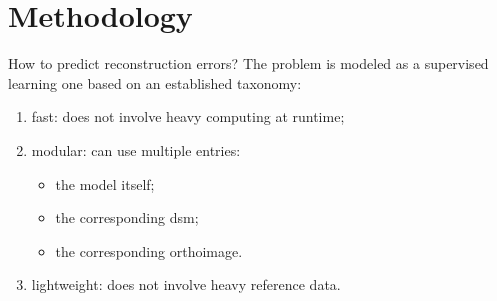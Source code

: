 \documentclass{beamer}
\begin{document}
    \section{Methodology}
        \begin{frame}{How to predict reconstruction errors?}
            The problem is modeled as a supervised learning one based on an established taxonomy:
            \begin{enumerate}[label = (\roman*)., font=\color{IGNGreen}]
                \item<2-> fast: does not involve heavy computing at runtime;
                \item<3-> modular: can use multiple entries:
                \begin{itemize}[label=--]
                    \item<4-> the model itself;
                    \item<5-> the corresponding \gls{dsm};
                    \item<6-> the corresponding orthoimage.
                \end{itemize}
                \item<7-> lightweight: does not involve heavy reference data.
            \end{enumerate}
        \end{frame}
\end{document}
